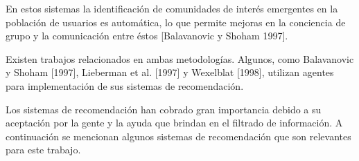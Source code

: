 En estos sistemas la identificación de comunidades de interés emergentes en la población de usuarios es automática, lo que permite mejoras en la conciencia de grupo y la comunicación entre éstos [Balavanovic y Shoham 1997].


Existen trabajos relacionados en ambas metodologías. Algunos, como Balavanovic y Shoham [1997], Lieberman et al. [1997] y Wexelblat [1998], utilizan agentes para implementación de sus sistemas de recomendación.


Los sistemas de recomendación han cobrado gran importancia debido a su aceptación por la gente y la ayuda que brindan en el filtrado de información. A continuación se mencionan algunos sistemas de recomendación que son relevantes para este trabajo.